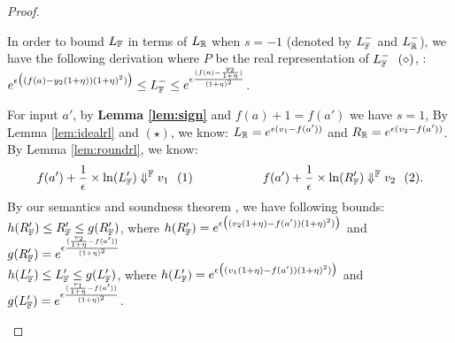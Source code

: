\documentclass[a4paper,11pt]{article}
\begin{document}
\begin{proof}
\begin{itemize}
\begin{itemize}
	In order to bound $L_{\mathbb{F}}$ in terms of $L_{\mathbb{R}}$ when $s = -1$ (denoted by $L_{\mathbb{F}}^-$ and $L_{\mathbb{R}}^-$), we have the following derivation where $P$ be the real representation of $L_{\mathbb{F}}^- ~~ (\diamond)$, :		%
		$e^{\epsilon 
				\big( (f(a) - y_2(1 + \eta)) (1 + \eta)^2) \big)}
        \leq
        L_{\mathbb{F}}^- \leq
        e^{\epsilon 
				\frac{(f(a) - \frac{y_2}{1 + \eta})}{(1 + \eta)^2}}$.
	\end{itemize}
		For input $a'$, by \textbf{Lemma \ref{lem:sign}} and $f(a) + 1 = f(a')$ we have $s = 1$, 
		By Lemma \ref{lem:idealrl} and $(\star) $, we know: $L_{\mathbb{R}} = e^{\epsilon(v_1 - f(a'))}$ and 
		$R_{\mathbb{R}} = e^{\epsilon(v_2 - f(a'))}$.
		\\
		By Lemma \ref{lem:roundrl}, we know:
		$$f(a') + \frac{1}{\epsilon} \times \ln(L_{\mathbb{F}}') \Downarrow^{\mathbb{F}} v_1 ~~ (1)
		~~~~~~~~~~~~~~~~~
		f(a') + \frac{1}{\epsilon} \times \ln(R_{\mathbb{F}}') \Downarrow^{\mathbb{F}} v_2 ~~ (2).$$
		By our semantics and soundness theorem , we have following bounds:
		\\
		$h(R_{\mathbb{F}}') \leq R_{\mathbb{F}}' \leq g(R_{\mathbb{F}}')$,
		where 
		$h(R_{\mathbb{F}}') = e^{\epsilon 
		\big( (v_2(1 + \eta) - f(a')) (1 + \eta)^2) \big)}$ 
		and
		$g(R_{\mathbb{F}}') = e^{\epsilon \frac{(\frac{v_2}{1 + \eta} - f(a'))}
		{(1 + \eta)^2}}$
		\\
		$h(L_{\mathbb{F}}') \leq L_{\mathbb{F}}' \leq g(L_{\mathbb{F}}')$, 
		where 
		$h(L_{\mathbb{F}}') = e^{\epsilon 
		\big( (v_1(1 + \eta) - f(a')) (1 + \eta)^2) \big)}$ 
		and
		$g(L_{\mathbb{F}}') = e^{\epsilon \frac{(\frac{v_1}{1 + \eta} - f(a'))}
		{(1 + \eta)^2}}$.



\end{itemize}
\end{proof}
\end{document}
